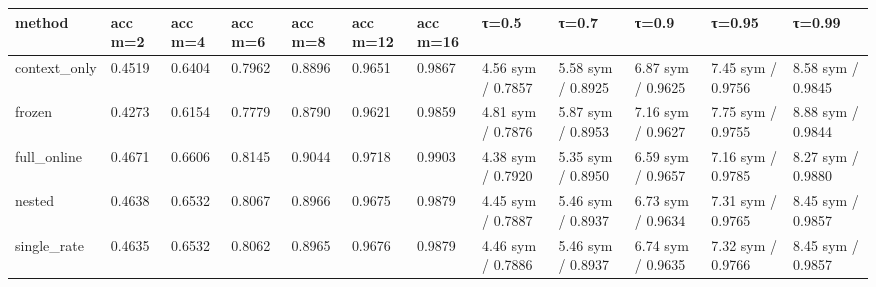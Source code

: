 \begin{tabular}{llllllllllll}
\hline
method & acc m=2 & acc m=4 & acc m=6 & acc m=8 & acc m=12 & acc m=16 & τ=0.5 & τ=0.7 & τ=0.9 & τ=0.95 & τ=0.99 \\
\hline
context\_only & 0.4519 & 0.6404 & 0.7962 & 0.8896 & 0.9651 & 0.9867 & 4.56 sym / 0.7857 & 5.58 sym / 0.8925 & 6.87 sym / 0.9625 & 7.45 sym / 0.9756 & 8.58 sym / 0.9845 \\
frozen & 0.4273 & 0.6154 & 0.7779 & 0.8790 & 0.9621 & 0.9859 & 4.81 sym / 0.7876 & 5.87 sym / 0.8953 & 7.16 sym / 0.9627 & 7.75 sym / 0.9755 & 8.88 sym / 0.9844 \\
full\_online & 0.4671 & 0.6606 & 0.8145 & 0.9044 & 0.9718 & 0.9903 & 4.38 sym / 0.7920 & 5.35 sym / 0.8950 & 6.59 sym / 0.9657 & 7.16 sym / 0.9785 & 8.27 sym / 0.9880 \\
nested & 0.4638 & 0.6532 & 0.8067 & 0.8966 & 0.9675 & 0.9879 & 4.45 sym / 0.7887 & 5.46 sym / 0.8937 & 6.73 sym / 0.9634 & 7.31 sym / 0.9765 & 8.45 sym / 0.9857 \\
single\_rate & 0.4635 & 0.6532 & 0.8062 & 0.8965 & 0.9676 & 0.9879 & 4.46 sym / 0.7886 & 5.46 sym / 0.8937 & 6.74 sym / 0.9635 & 7.32 sym / 0.9766 & 8.45 sym / 0.9857 \\
\hline
\end{tabular}
